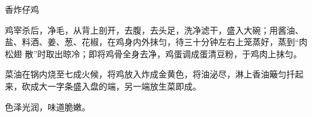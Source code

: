 \begin{recipe}[喇嘛仔鸡]{香炸仔鸡}

\ingredients


\preparation

\step 鸡宰杀后，净毛，从背上剖开，去腹，去头足，洗净滤干，盛入大碗；用酱油、
盐、料酒、姜、葱、花椒，在鸡身内外抹匀，待三十分钟左右上笼蒸好，蒸到“肉松翅
散”时取出晾冷；即将鸡骨全身去净，鸡蛋调成蛋清豆粉，于鸡肉上抹匀。

\step 菜油在锅内烧至七成火候，将鸡放入炸成金黄色，将油泌尽，淋上香油簸匀扦起
来，砍成大一字条盛入盘的端，另一端放生菜即成。

\features

色泽光润，味道脆嫩。

\end{recipe}

